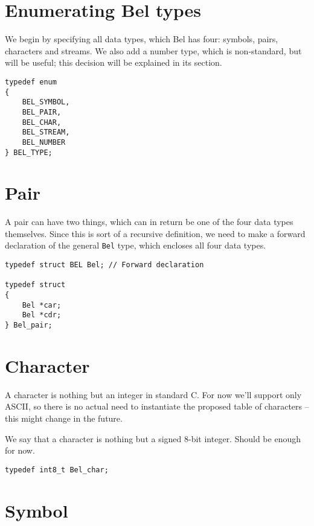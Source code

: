 \documentclass[openright,a4paper,twoside,12pt]{memoir}
\begin{document}
\section{Enumerating Bel types}
\label{sec:org1958574}

We begin by specifying all data types, which Bel has four: symbols,
pairs, characters and streams. We also add a number type, which is
non-standard, but will be useful; this decision will be explained in
its section.

\begin{verbatim}
typedef enum
{
    BEL_SYMBOL,
    BEL_PAIR,
    BEL_CHAR,
    BEL_STREAM,
    BEL_NUMBER
} BEL_TYPE;
\end{verbatim}

\section{Pair}
\label{sec:org79e4e23}

A pair can have two things, which can in return be one of the four
data types themselves. Since this is sort of a recursive definition,
we need to make a forward declaration of the general \texttt{Bel} type, which
encloses all four data types.

\begin{verbatim}
typedef struct BEL Bel; // Forward declaration

typedef struct
{
    Bel *car;
    Bel *cdr;
} Bel_pair;
\end{verbatim}

\section{Character}
\label{sec:org6fe3fff}

A character is nothing but an integer in standard C. For now we'll
support only ASCII, so there is no actual need to instantiate the
proposed table of characters -- this might change in the future.

We say that a character is nothing but a signed 8-bit integer. Should
be enough for now.

\begin{verbatim}
typedef int8_t Bel_char;
\end{verbatim}

\section{Symbol}
\label{sec:org5f95714}
\end{document}
